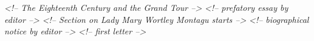 \begin{shaded}
\hspace*{1em}\mbox{}\newline 
\hspace*{1em}\mbox{}\newline 
\textit{<!-- The Eighteenth Century and the Grand Tour -->}\mbox{}\newline 
\hspace*{1em}\hspace*{1em}\mbox{}\newline 
\textit{<!-- prefatory essay by editor -->}\mbox{}\newline 
\hspace*{1em}\hspace*{1em}\mbox{}\newline 
\hspace*{1em}\hspace*{1em}\mbox{}\newline 
\textit{<!-- Section on Lady Mary Wortley Montagu starts -->}\mbox{}\newline 
\hspace*{1em}\hspace*{1em}\hspace*{1em}\mbox{}\newline 
\textit{<!-- biographical notice by editor -->}\mbox{}\newline 
\hspace*{1em}\hspace*{1em}\hspace*{1em}\mbox{}\newline 
\hspace*{1em}\hspace*{1em}\hspace*{1em}\mbox{}\newline 
\textit{<!-- first letter -->}\mbox{}\newline 
\hspace*{1em}\hspace*{1em}\hspace*{1em}\mbox{}\newline 

\end{shaded}
